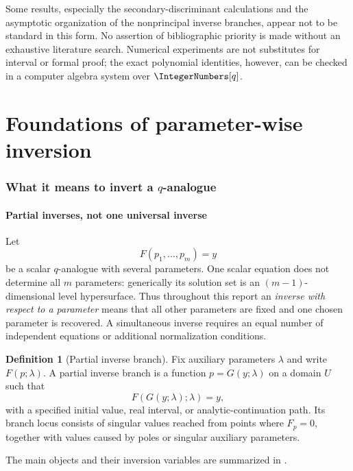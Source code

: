\documentclass[11pt,oneside]{article}
\theoremstyle{definition}
\newtheorem{definition}[theorem]{Definition}
\theoremstyle{remark}
\theoremstyle{plain}
\theoremstyle{definition}
\theoremstyle{remark}
\numberwithin{equation}{section}
\numberwithin{figure}{section}
\numberwithin{table}{section}
\let\reporttopsection\section
\let\reportsubsection\subsection
\let\reportsubsubsection\subsubsection
\let\chapter\reporttopsection
\let\section\reportsubsection
\let\subsection\reportsubsubsection
\providecommand{\mainmatter}{}
\begin{document}
Some results, especially the secondary-discriminant calculations and the
asymptotic organization of the nonprincipal inverse branches, appear not to be
standard in this form.  No assertion of bibliographic priority is made without
an exhaustive literature search.  Numerical experiments are not substitutes
for interval or formal proof; the exact polynomial identities, however, can be
checked in a computer algebra system over \(\IntegerNumbers[q]\).

\tableofcontents
\listoffigures

\mainmatter

\part{Foundations of parameter-wise inversion}

\chapter{What it means to invert a \texorpdfstring{\(q\)}{q}-analogue}

\section{Partial inverses, not one universal inverse}
Let
\[
 F(p_1,\ldots,p_m)=y
\]
be a scalar \(q\)-analogue with several parameters.  One scalar equation does
not determine all \(m\) parameters: generically its solution set is an
\((m-1)\)-dimensional level hypersurface.  Thus throughout this report an
\emph{inverse with respect to a parameter} means that all other parameters are
fixed and one chosen parameter is recovered.  A simultaneous inverse requires
an equal number of independent equations or additional normalization
conditions.

\begin{definition}[Partial inverse branch]
Fix auxiliary parameters \(\lambda\) and write \(F(p;\lambda)\).  A partial
inverse branch is a function \(p=G(y;\lambda)\) on a domain \(U\) such that
\[
 F(G(y;\lambda);\lambda)=y,
\]
with a specified initial value, real interval, or analytic-continuation path.
Its branch locus consists of singular values reached from points where
\(F_p=0\), together with values caused by poles or singular auxiliary
parameters.
\end{definition}

The main objects and their inversion variables are summarized in
.
\end{document}
